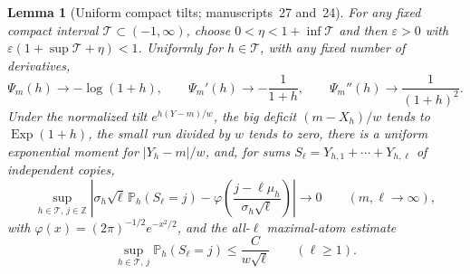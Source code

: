 \documentclass[11pt,a4paper]{article}
\newtheorem{lemma}[lemma]{Lemma}
\theoremstyle{definition}\newaliascnt{definition}{theorem}
\theoremstyle{remark}\newaliascnt{remark}{theorem}
\newcommand{\ljP}{\mathbb P}
\begin{document}
\begin{lemma}[Uniform compact tilts; manuscripts~27 and~24]
\label{jg:ic:lem:tilts}
For any fixed compact interval $\mathcal T\subset(-1,\infty)$, choose
$0<\eta<1+\inf\mathcal T$ and then $\varepsilon>0$ with
$\varepsilon(1+\sup\mathcal T+\eta)<1$. Uniformly for $h\in\mathcal T$, with any
fixed number of derivatives,
\begin{equation}\label{jg:ic:eq:mgflimit}
 \Psi_m(h)\to-\log(1+h),\qquad
 \Psi_m'(h)\to-\frac1{1+h},\qquad
 \Psi_m''(h)\to\frac1{(1+h)^2}.
\end{equation}
Under the normalized tilt $e^{h(Y-m)/w}$, the big deficit $(m-X_h)/w$ tends to
$\operatorname{Exp}(1+h)$, the small run divided by $w$ tends to zero, there is
a uniform exponential moment for $|Y_h-m|/w$, and, for sums
$S_\ell=Y_{h,1}+\cdots+Y_{h,\ell}$ of independent copies,
\begin{equation}\label{jg:ic:eq:llt}
 \sup_{h\in\mathcal T,\,j\in\mathbb Z}\left|
 \sigma_h\sqrt\ell\,\ljP_h(S_\ell=j)
 -\varphi\!\left(\frac{j-\ell\mu_h}{\sigma_h\sqrt\ell}\right)
 \right|\longrightarrow0
 \qquad(m,\ell\to\infty),
\end{equation}
with $\varphi(x)=(2\pi)^{-1/2}e^{-x^2/2}$, and the all-$\ell$ maximal-atom
estimate
\begin{equation}\label{jg:ic:eq:atom}
 \sup_{h\in\mathcal T,\,j}\ljP_h(S_\ell=j)\le\frac{C}{w\sqrt\ell}
 \qquad(\ell\ge1).
\end{equation}
\end{lemma}
\end{document}
